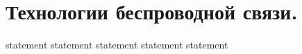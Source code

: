 \chapter{Технологии беспроводной связи.}

{statement}
{statement}
{statement}
{statement}
{statement}
